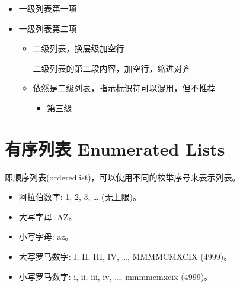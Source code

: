 \documentclass[a4paper,10pt,english]{sphinxmanual}
\begin{document}
\sphinxAtStartPar
{}
\begin{itemize}
\item {} 
\sphinxAtStartPar
一级列表第一项

\item {} 
\sphinxAtStartPar
一级列表第二项
\begin{itemize}
\item {} 
\sphinxAtStartPar
二级列表，换层级加空行

\sphinxAtStartPar
二级列表的第二段内容，加空行，缩进对齐

\end{itemize}
\begin{itemize}
\item {} 
\sphinxAtStartPar
依然是二级列表，指示标识符可以混用，但不推荐
\begin{itemize}
\item {} 
\sphinxAtStartPar
第三级

\end{itemize}

\end{itemize}

\end{itemize}


\section{有序列表 Enumerated Lists}
\label{\detokenize{reStructureText_syntax:enumerated-lists}}
\sphinxAtStartPar
{} 即顺序列表(ordered\sphinxhyphen{}list)，可以使用不同的枚举序号来表示列表。

\sphinxAtStartPar
{}
\begin{itemize}
\item {} 
\sphinxAtStartPar
阿拉伯数字: 1, 2, 3, … (无上限)。

\item {} 
\sphinxAtStartPar
大写字母: A\sphinxhyphen{}Z。

\item {} 
\sphinxAtStartPar
小写字母: a\sphinxhyphen{}z。

\item {} 
\sphinxAtStartPar
大写罗马数字: I, II, III, IV, …, MMMMCMXCIX (4999)。

\item {} 
\sphinxAtStartPar
小写罗马数字: i, ii, iii, iv, …, mmmmcmxcix (4999)。

\end{itemize}
\end{document}
